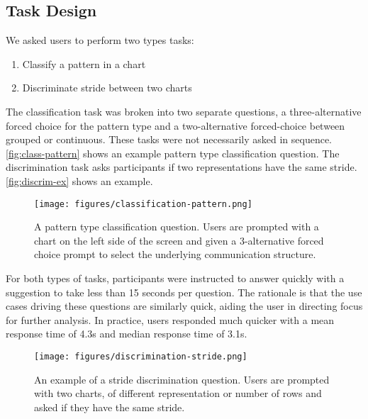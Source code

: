 \subsection{Task Design}

    We asked users to perform two types tasks:
    \vspace{-.5em}
    \begin{enumerate}[start=1, label={\bfseries T\arabic*}]
        \itemsep0em
        \item Classify a pattern in a chart
        \item Discriminate stride between two charts
    \end{enumerate}
    
    The classification task was broken into two separate questions, a three-alternative forced choice for the pattern type and a two-alternative forced-choice between grouped or continuous. These tasks were not necessarily asked in sequence. \autoref{fig:class-pattern} shows an example pattern type classification question. The discrimination task asks participants if two representations have the same stride. \autoref{fig:discrim-ex} shows an example.
    
    \begin{figure}[htb]
        \centering
        \texttt{[image: figures/classification-pattern.png]}
        \caption{A pattern type classification question. Users are prompted with a chart on the left side of the screen and given a 3-alternative forced choice prompt to select the underlying communication structure.}
        \label{fig:class-pattern}
    \end{figure}
 


For both types of tasks, participants were instructed to answer quickly with a suggestion to take less than 15 seconds per question. The rationale is that the use cases driving these questions are similarly quick, aiding the user in directing focus for further analysis. In practice, users responded much quicker with a mean response time of 4.3s and median response time of 3.1s. 
    
    \begin{figure}[htb]
        \centering
        \texttt{[image: figures/discrimination-stride.png]}
        \caption{An example of a stride discrimination question. Users are prompted with two charts, of different representation or number of rows and asked if they have the same stride.}
        \label{fig:discrim-ex}
    \end{figure}
    
